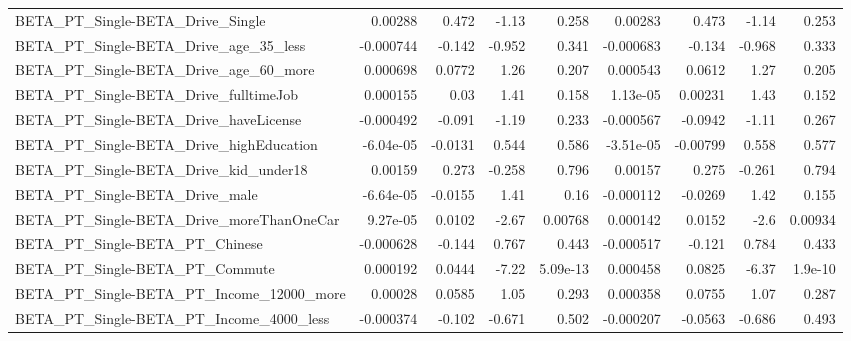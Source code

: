 \begin{tabular}{lrrrrrrrr}
BETA\_PT\_Single-BETA\_Drive\_Single                   &     0.00288 &        0.472 &     -1.13 &    0.258 &    0.00283 &       0.473 &        -1.14 &         0.253 \\
BETA\_PT\_Single-BETA\_Drive\_age\_35\_less              &   -0.000744 &       -0.142 &    -0.952 &    0.341 &  -0.000683 &      -0.134 &       -0.968 &         0.333 \\
BETA\_PT\_Single-BETA\_Drive\_age\_60\_more              &    0.000698 &       0.0772 &      1.26 &    0.207 &   0.000543 &      0.0612 &         1.27 &         0.205 \\
BETA\_PT\_Single-BETA\_Drive\_fulltimeJob              &    0.000155 &         0.03 &      1.41 &    0.158 &   1.13e-05 &     0.00231 &         1.43 &         0.152 \\
BETA\_PT\_Single-BETA\_Drive\_haveLicense              &   -0.000492 &       -0.091 &     -1.19 &    0.233 &  -0.000567 &     -0.0942 &        -1.11 &         0.267 \\
BETA\_PT\_Single-BETA\_Drive\_highEducation            &   -6.04e-05 &      -0.0131 &     0.544 &    0.586 &  -3.51e-05 &    -0.00799 &        0.558 &         0.577 \\
BETA\_PT\_Single-BETA\_Drive\_kid\_under18              &     0.00159 &        0.273 &    -0.258 &    0.796 &    0.00157 &       0.275 &       -0.261 &         0.794 \\
BETA\_PT\_Single-BETA\_Drive\_male                     &   -6.64e-05 &      -0.0155 &      1.41 &     0.16 &  -0.000112 &     -0.0269 &         1.42 &         0.155 \\
BETA\_PT\_Single-BETA\_Drive\_moreThanOneCar           &    9.27e-05 &       0.0102 &     -2.67 &  0.00768 &   0.000142 &      0.0152 &         -2.6 &       0.00934 \\
BETA\_PT\_Single-BETA\_PT\_Chinese                     &   -0.000628 &       -0.144 &     0.767 &    0.443 &  -0.000517 &      -0.121 &        0.784 &         0.433 \\
BETA\_PT\_Single-BETA\_PT\_Commute                     &    0.000192 &       0.0444 &     -7.22 & 5.09e-13 &   0.000458 &      0.0825 &        -6.37 &       1.9e-10 \\
BETA\_PT\_Single-BETA\_PT\_Income\_12000\_more           &     0.00028 &       0.0585 &      1.05 &    0.293 &   0.000358 &      0.0755 &         1.07 &         0.287 \\
BETA\_PT\_Single-BETA\_PT\_Income\_4000\_less            &   -0.000374 &       -0.102 &    -0.671 &    0.502 &  -0.000207 &     -0.0563 &       -0.686 &         0.493 \\

\end{tabular}
